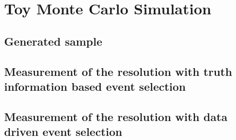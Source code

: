 

\section{Toy Monte Carlo Simulation}


\subsection{Generated sample}


\subsection{Measurement of the resolution with truth information based event selection}


\subsection{Measurement of the resolution with data driven event selection}
